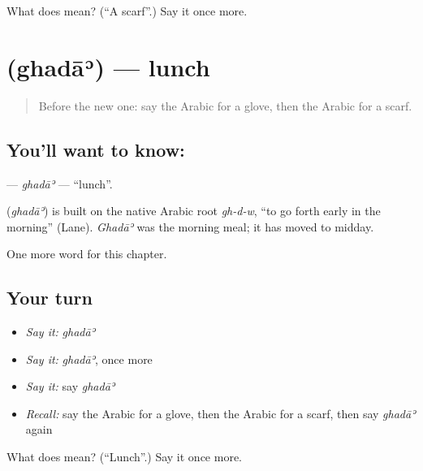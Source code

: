 \begin{tcolorbox}[breakable,colback=teal!4,colframe=teal!35!black,title={Before you move on}]
What does  mean? (\textquotedblleft{}A scarf\textquotedblright{}.) Say it once more.
\end{tcolorbox}
\section[\texorpdfstring{\ar{غداء} (ghadāʾ)}{غداء (ghadāʾ)}]{ (ghadāʾ) — lunch}

\label{lesson:AR-C119-ghada}



\begin{quote}
Before the new one: say the Arabic for a glove, then the Arabic for a scarf.
\end{quote}

\subsection*{You'll want to know: }
\textbf{} — \emph{ghadāʾ} — \textquotedblleft{}lunch\textquotedblright{}.

\begin{cousinweb}
\textbf{} (\emph{ghadāʾ}) is built on the native Arabic root \emph{gh-d-w}, \textquotedblleft{}to go forth early in the morning\textquotedblright{} (Lane). \emph{Ghadāʾ} was the morning meal; it has moved to midday.
\end{cousinweb}

\begin{grammarlens}[title={What you've built}]
One more word for this chapter.
\end{grammarlens}

\subsection*{Your turn}
\begin{itemize}
\raggedright
  \item \emph{Say it:} \emph{ghadāʾ}
  \item \emph{Say it:} \emph{ghadāʾ}, once more
  \item \emph{Say it:} say \emph{ghadāʾ}
  \item \emph{Recall:} say the Arabic for a glove, then the Arabic for a scarf, then say \emph{ghadāʾ} again
\end{itemize}

\begin{tcolorbox}[breakable,colback=teal!4,colframe=teal!35!black,title={Before you move on}]
What does  mean? (\textquotedblleft{}Lunch\textquotedblright{}.) Say it once more.
\end{tcolorbox}
